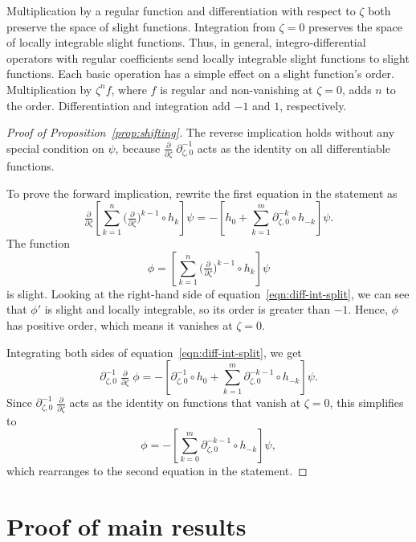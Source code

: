 \documentclass{article}
\theoremstyle{definition}
\newcommand{\fracderiv}[3]{\partial^{#1}_{#2, #3}}
\begin{document}
Multiplication by a regular function and differentiation with respect to $\zeta$ both preserve the space of slight functions. Integration from $\zeta = 0$ preserves the space of locally integrable slight functions. Thus, in general, integro-differential operators with regular coefficients send locally integrable slight functions to slight functions. Each basic operation has a simple effect on a slight function's order. Multiplication by $\zeta^n f$, where $f$ is regular and non-vanishing at $\zeta = 0$, adds $n$ to the order. Differentiation and integration add $-1$ and $1$, respectively.
\begin{proof}[Proof of Proposition~\ref{prop:shifting}]
The reverse implication holds without any special condition on $\psi$, because $\tfrac{\partial}{\partial \zeta}\;\fracderiv{-1}{\zeta}{0}$ acts as the identity on all differentiable functions.

To prove the forward implication, rewrite the first equation in the statement as
\begin{equation}\label{eqn:diff-int-split}
\tfrac{\partial}{\partial \zeta} \left[ \sum_{k = 1}^n \big(\tfrac{\partial}{\partial \zeta}\big)^{k-1} \circ h_k \right] \psi = -\left[ h_0 + \sum_{k = 1}^m \fracderiv{-k}{\zeta}{0} \circ h_{-k} \right] \psi.
\end{equation}
The function
\[ \phi = \left[ \sum_{k = 1}^n \big(\tfrac{\partial}{\partial \zeta}\big)^{k-1} \circ h_k \right] \psi \]
is slight. Looking at the right-hand side of equation~\ref{eqn:diff-int-split}, we can see that $\phi'$ is slight and locally integrable, so its order is greater than $-1$. Hence, $\phi$ has positive order, which means it vanishes at $\zeta = 0$.

Integrating both sides of equation~\ref{eqn:diff-int-split}, we get
\[ \fracderiv{-1}{\zeta}{0}\;\tfrac{\partial}{\partial \zeta}\;\phi = -\left[ \fracderiv{-1}{\zeta}{0} \circ h_0 + \sum_{k = 1}^m \fracderiv{-k-1}{\zeta}{0} \circ h_{-k} \right] \psi. \]
Since $\fracderiv{-1}{\zeta}{0}\;\tfrac{\partial}{\partial \zeta}$ acts as the identity on functions that vanish at $\zeta = 0$, this simplifies to
\[ \phi = -\left[ \sum_{k = 0}^m \fracderiv{-k-1}{\zeta}{0} \circ h_{-k} \right] \psi, \]
which rearranges to the second equation in the statement.
\end{proof}

\section{Proof of main results}
\end{document}
